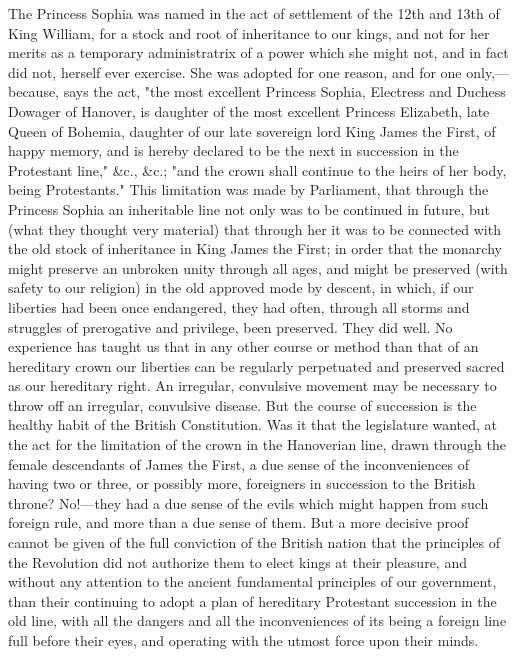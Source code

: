 The Princess Sophia was named in the act of settlement of the 12th and 13th of King William, for a stock and root of inheritance to our kings, and not for her merits as a temporary administratrix of a power which she might not, and in fact did not, herself ever exercise. She was adopted for one reason, and for one only,—because, says the act, "the most excellent Princess Sophia, Electress and Duchess Dowager of Hanover, is daughter of the most excellent Princess Elizabeth, late Queen of Bohemia, daughter of our late sovereign lord King James the First, of happy memory, and is hereby declared to be the next in succession in the Protestant line," \&c., \&c.; "and the crown shall continue to the heirs of her body, being Protestants." This limitation was made by Parliament, that through the Princess Sophia an inheritable line not only was to be continued in future, but (what they thought very material) that through her it was to be connected with the old stock of inheritance in King James the First; in order that the monarchy might preserve an unbroken unity through all ages, and might be preserved (with safety to our religion) in the old approved mode by descent, in which, if our liberties had been once endangered, they had often, through all storms and struggles of prerogative and privilege, been preserved. They did well. No experience has taught us that in any other course or method than that of an hereditary crown our liberties can be regularly perpetuated and preserved sacred as our hereditary right. An irregular, convulsive movement may be necessary to throw off an irregular, convulsive disease. But the course of succession is the healthy habit of the British Constitution. Was it that the legislature wanted, at the act for the limitation of the crown in the Hanoverian line, drawn through the female descendants of James the First, a due sense of the inconveniences of having two or three, or possibly more, foreigners in succession to the British throne? No!—they had a due sense of the evils which might happen from such foreign rule, and more than a due sense of them. But a more decisive proof cannot be given of the full conviction of the British nation that the principles of the Revolution did not authorize them to elect kings at their pleasure, and without any attention to the ancient fundamental principles of our government, than their continuing to adopt a plan of hereditary Protestant succession in the old line, with all the dangers and all the inconveniences of its being a foreign line full before their eyes, and operating with the utmost force upon their minds.

